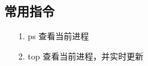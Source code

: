 \documentclass[a4paper,left=1.5cm,right=1.5cm,11pt]{article}
\begin{document}
\tableofcontents

\clearpage

\subsection{常用指令}
\begin{itemize}
	\item[1.]ps  查看当前进程
	\item[2.]top 查看当前进程，并实时更新
\end{itemize}
\end{document}
